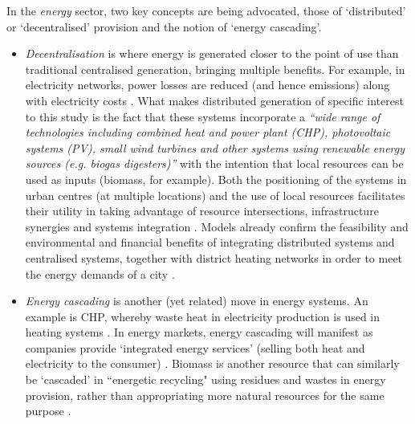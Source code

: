 In the \emph{energy} sector, two key concepts are being advocated, those of `distributed' or `decentralised' provision and the notion of `energy cascading'. 
\begin{itemize} 
	\item \emph{Decentralisation} is where energy is generated closer to the point of use than traditional centralised generation, bringing multiple benefits. For example, in electricity networks, power losses are reduced (and hence emissions) along with electricity costs \citep{Fleten2007}. What makes distributed generation of specific interest to this study is the fact that these systems incorporate a \emph{``wide range of technologies including combined heat and power plant (CHP), photovoltaic systems (PV), small wind turbines and other systems using renewable energy sources (e.g. biogas digesters)''} \citep[p. 1001]{Ren2010} with the intention that local resources can be used as inputs (biomass, for example). Both the positioning of the systems in urban centres (at multiple locations) and the use of local resources facilitates their utility in taking advantage of resource intersections, infrastructure synergies and systems integration . Models already confirm the feasibility and environmental and financial benefits of integrating distributed systems and centralised systems, together with district heating networks in order to meet the energy demands of a city \citep{Weber2011}. 
	\item \emph{Energy cascading} is another (yet related) move in energy systems. An example is CHP, whereby waste heat in electricity production is used in heating systems \citep{Grubler2009}. In energy markets, energy cascading will manifest as companies provide `integrated energy services' (selling both heat and electricity to the consumer) \citep{Sugihara2004}. Biomass is another resource that can similarly be `cascaded' in ``energetic recycling" using residues and wastes in energy provision, rather than appropriating more natural resources for the same purpose \citep{Haberl2001a}.
\end{itemize}

